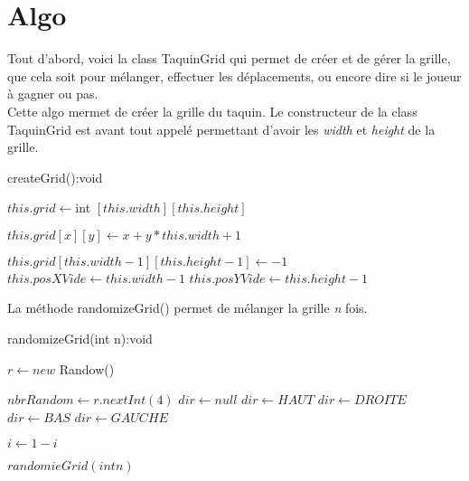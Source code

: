 \documentclass{article}
\begin{document}
\section{Algo}
Tout d'abord, voici la class TaquinGrid qui permet de créer et de gérer la grille, que cela soit pour mélanger, effectuer les déplacements, ou encore dire si le joueur à gagner ou pas.
\newline
\\
Cette algo mermet de créer la grille du taquin. Le constructeur de la class TaquinGrid est avant tout appelé permettant d'avoir les \textit{width} et \textit{height} de la grille.
\begin{algorithm}
    \caption{createGrid():void}
    \begin{algorithmic}
        \STATE $this.grid \leftarrow $int $[this.width][this.height]$
        
                \STATE $this.grid[x][y] \leftarrow x+y*this.width+1$
            \ENDFOR
        \ENDFOR
        
        \STATE $this.grid[this.width-1][this.height-1] \leftarrow -1$
        \STATE $this.posXVide \leftarrow this.width-1$
        \STATE $this.posYVide \leftarrow this.height-1$
    \end{algorithmic}
\end{algorithm}
\newline
La méthode randomizeGrid() permet de mélanger la grille \textit{n} fois.
\\
\begin{algorithm}
    \caption{randomizeGrid(int n):void}
    \begin{algorithmic}
        \STATE $r\leftarrow new$ Randow()
        
            \STATE $nbrRandom \leftarrow r.nextInt(4)$
            \STATE  $dir \leftarrow null$
                \STATE $dir \leftarrow HAUT$
                \STATE $dir \leftarrow DROITE$
                \STATE $dir \leftarrow BAS$
                \STATE $dir \leftarrow GAUCHE$
            \ENDIF
            
                \STATE $i \leftarrow 1-i$
            \ENDIF
        \ENDFOR
        
            \STATE $randomieGrid(int n)$
        \ENDIF
    \end{algorithmic}
\end{algorithm}
\end{document}
